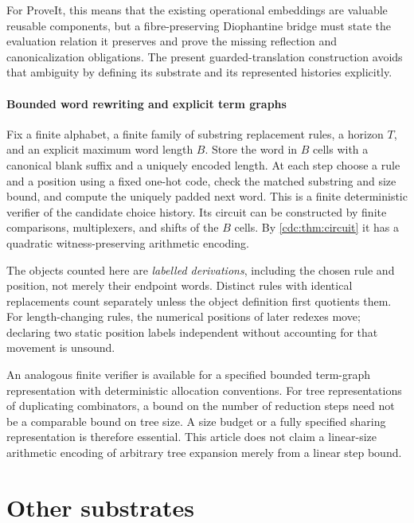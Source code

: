 \documentclass[11pt,a4paper]{article}
\theoremstyle{definition}
\theoremstyle{remark}
\begin{document}
For ProveIt, this means that the existing operational embeddings are valuable reusable components, but a fibre-preserving Diophantine bridge must state the evaluation relation it preserves and prove the missing reflection and canonicalization obligations. The present guarded-translation construction avoids that ambiguity by defining its substrate and its represented histories explicitly.


\subsection{Bounded word rewriting and explicit term graphs}
Fix a finite alphabet, a finite family of substring replacement rules, a horizon $T$, and an explicit maximum word length $B$. Store the word in $B$ cells with a canonical blank suffix and a uniquely encoded length. At each step choose a rule and a position using a fixed one-hot code, check the matched substring and size bound, and compute the uniquely padded next word. This is a finite deterministic verifier of the candidate choice history. Its circuit can be constructed by finite comparisons, multiplexers, and shifts of the $B$ cells. By \cref{cdc:thm:circuit} it has a quadratic witness-preserving arithmetic encoding.

The objects counted here are \emph{labelled derivations}, including the chosen rule and position, not merely their endpoint words. Distinct rules with identical replacements count separately unless the object definition first quotients them. For length-changing rules, the numerical positions of later redexes move; declaring two static position labels independent without accounting for that movement is unsound.

An analogous finite verifier is available for a specified bounded term-graph representation with deterministic allocation conventions. For tree representations of duplicating combinators, a bound on the number of reduction steps need not be a comparable bound on tree size. A size budget or a fully specified sharing representation is therefore essential. This article does not claim a linear-size arithmetic encoding of arbitrary tree expansion merely from a linear step bound.


\part{Other substrates}\label{cdc:part:substrates}
\end{document}
